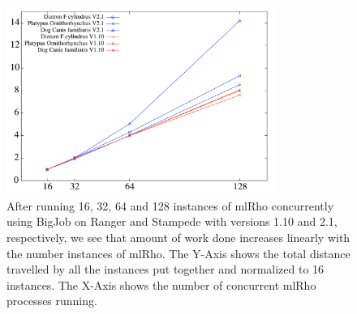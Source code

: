 \documentclass{sig-alternate}
\begin{document}
\begin{figure} %
\centering
\includegraphics[width=0.78\textwidth]{figures/bj-scaling.pdf}
\caption{After running 16, 32, 64 and 128 instances of mlRho concurrently using BigJob on Ranger and Stampede with versions 1.10 and 2.1, respectively, we see that amount of work done increases linearly with the number instances of mlRho. The Y-Axis shows the total distance travelled by all the instances put together and normalized to 16 instances. The X-Axis shows the number of concurrent mlRho processes running. }
\label{fig:stampede-bench}
\end{figure}



%
%
\end{document}

